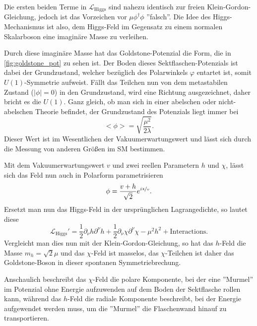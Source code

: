Die ersten beiden Terme in $\mathcal{L}_\text{Higgs}$ sind nahezu identisch zur freien Klein-Gordon-Gleichung, jedoch ist das Vorzeichen vor $\mu\phi^\dagger\phi$ ''falsch''.
Die Idee des Higgs-Mechanismus ist also, dem Higgs-Feld im Gegensatz zu einem normalen Skalarboson eine imaginäre Masse zu verleihen.

Durch diese imaginäre Masse hat das Goldstone-Potenzial die Form, die in \autoref{fig:goldstone_pot} zu sehen ist. %
Der Boden dieses Sektflaschen-Potenzials ist dabei der Grundzustand, welcher bezüglich des Polarwinkels $\varphi$ entartet ist, somit $U(1)$-Symmetrie aufweist.
Fällt das Teilchen nun von dem metastabilen Zustand ($|\phi|=0$) in den Grundzustand, wird eine Richtung ausgezeichnet, daher bricht es die $U(1)$.
Ganz gleich, ob man sich in einer abelschen oder nicht-abelschen Theorie befindet, der Grundzustand des Potenzials liegt immer bei
\begin{equation*}
	<\phi> = \sqrt{\frac{\mu^2}{2\lambda}}.
\end{equation*}
Dieser Wert ist im Wesentlichen der Vakuumerwartungswert und lässt sich durch die Messung von anderen Größen im SM bestimmen.

Mit dem Vakuumerwartungswert $v$ und zwei reellen Parametern $h$ und $\chi$, lässt sich das Feld nun auch in Polarform parametrisieren
\begin{equation*}
	\phi = \frac{v+h}{\sqrt{2}}e^{i\nicefrac{\chi}{v}}.
\end{equation*}
Ersetzt man nun das Higgs-Feld in der ursprünglichen Lagrangedichte, so lautet diese
\begin{equation*}
	\mathcal{L}_\text{Higgs}' = \frac{1}{2}\partial_\nu h\partial^\nu h + \frac{1}{2}\partial_\nu\chi\partial^\nu\chi - \mu^2h^2 + \text{Interactions}.
\end{equation*}
Vergleicht man dies nun mit der Klein-Gordon-Gleichung, so hat das $h$-Feld die Masse $m_h=\sqrt{2}\mu$ und das $\chi$-Feld ist masselos, das $\chi$-Teilchen ist daher das Goldstone-Boson in dieser spontanen Symmetriebrechung.

Anschaulich beschreibt das $\chi$-Feld die polare Komponente, bei der eine ''Murmel'' im Potenzial ohne Energie aufzuwenden auf dem Boden der Sektflasche rollen kann, während das $h$-Feld die radiale Komponente beschreibt, bei der Energie aufgewendet werden muss, um die ''Murmel'' die Flaschenwand hinauf zu transportieren.
